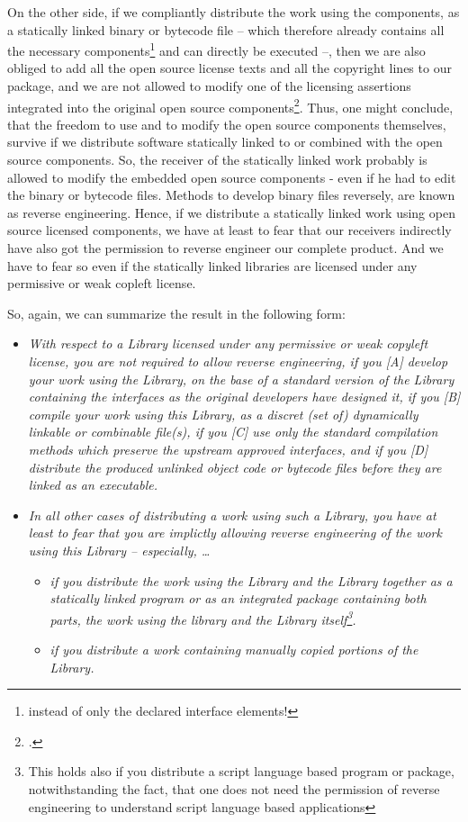 On the other side, if we compliantly distribute the work using the components,
as a statically linked binary or bytecode file -- which therefore already
contains all the necessary components\footnote{instead of only the declared
interface elements!} and can directly be executed --, then we are also obliged
to add all the open source license texts and all the copyright lines to our
package, and we are not allowed to modify one of the licensing assertions
integrated into the original open source components\footcite[cf.][chapter
6.]{Reincke2015a}. Thus, one might conclude, that the freedom to use and to
modify the open source components themselves, survive if we distribute software
statically linked to or combined with the open source components. So, the
receiver of the statically linked work probably is allowed to modify the
embedded open source components - even if he had to edit the binary or bytecode
files. Methods to develop binary files reversely, are known as reverse
engineering. Hence, if we distribute a statically linked work using open source
licensed components, we have at least to fear that our receivers indirectly have
also got the permission to reverse engineer our complete product. And we have to
fear so even if the statically linked libraries are licensed under any
permissive or weak copleft license.

So, again, we can summarize the result in the following form:

\begin{itemize}
  \item \emph{With respect to a Library licensed under any permissive or weak
  copyleft license, you are not required to allow reverse engineering, if you
  [A] develop your work using the Library, on the base of a standard version of
  the Library containing the interfaces as the original developers have designed it,
  if you [B] compile your work using this Library, as a discret (set of)
  dynamically linkable or combinable file(s), if you [C] use only the standard
  compilation methods which preserve the upstream approved interfaces, and if
  you [D] distribute the produced unlinked object code or bytecode files before
  they are linked as an executable.}
  \item \emph{In all other cases of distributing a work using such a Library,
  you have at least to fear that you are implictly allowing reverse engineering
  of the work using this Library -- especially, \ldots}
  \begin{itemize}
    \item \emph{if you distribute the work using the Library and the Library
    together as a statically linked program or as an integrated package
    containing both parts, the work using the library and the Library
    itself\footnote{This holds also if you distribute a script language based
    program or package, notwithstanding the fact, that one does not need the
    permission of reverse engineering to understand script language based
    applications}.}
    \item \emph{if you distribute a work containing manually copied portions of
    the Library.}
  \end{itemize}
\end{itemize}



